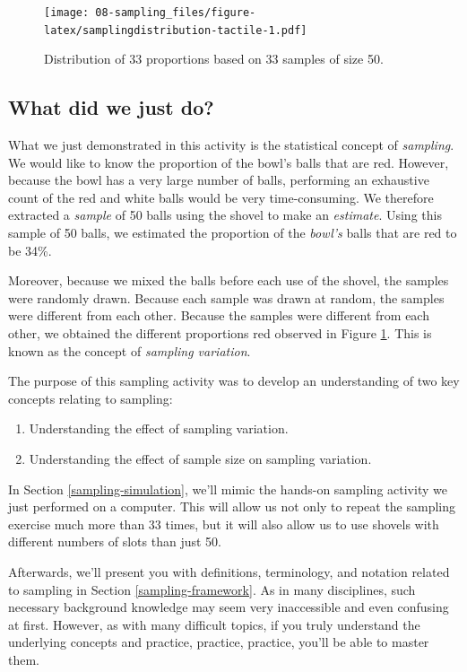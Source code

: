 \documentclass[
]{book}
\providecommand{\tightlist}{%
  \setlength{\itemsep}{0pt}\setlength{\parskip}{0pt}}
\begin{document}
\begin{figure}
\centering
\texttt{[image: 08-sampling\_files/figure-latex/samplingdistribution-tactile-1.pdf]}
\caption{\label{fig:samplingdistribution-tactile}Distribution of 33 proportions based on 33 samples of size 50.}
\end{figure}

\hypertarget{what-did-we-just-do}{%
\subsection{What did we just do?}\label{what-did-we-just-do}}

What we just demonstrated in this activity is the statistical concept of  \emph{sampling}. We would like to know the proportion of the bowl's balls that are red. However, because the bowl has a very large number of balls, performing an exhaustive count of the red and white balls would be very time-consuming. We therefore extracted a \emph{sample} of 50 balls using the shovel to make an \emph{estimate}. Using this sample of 50 balls, we estimated the proportion of the \emph{bowl's} balls that are red to be 34\%.

Moreover, because we mixed the balls before each use of the shovel, the samples were randomly drawn. Because each sample was drawn at random, the samples were different from each other. Because the samples were different from each other, we obtained the different proportions red observed in Figure \ref{fig:samplingdistribution-tactile}. This is known as the concept of \emph{sampling variation}. 

The purpose of this sampling activity was to develop an understanding of two key concepts relating to sampling:

\begin{enumerate}
\def\labelenumi{\arabic{enumi}.}
\tightlist
\item
  Understanding the effect of sampling variation.
\item
  Understanding the effect of sample size on sampling variation.
\end{enumerate}

In Section \ref{sampling-simulation}, we'll mimic the hands-on sampling activity we just performed on a computer. This will allow us not only to repeat the sampling exercise much more than 33 times, but it will also allow us to use shovels with different numbers of slots than just 50.

Afterwards, we'll present you with definitions, terminology, and notation related to sampling in Section \ref{sampling-framework}. As in many disciplines, such necessary background knowledge may seem very inaccessible and even confusing at first. However, as with many difficult topics, if you truly understand the underlying concepts and practice, practice, practice, you'll be able to master them.
\end{document}
